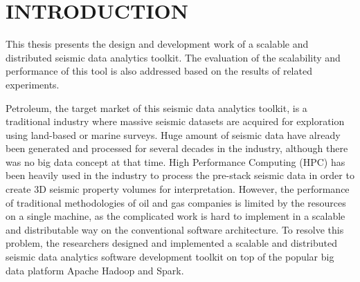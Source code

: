 %
%
%


\pagestyle{myheadings}
\setcounter{page}{1}


\chapter{\uppercase {Introduction}}
\let\thefootnote\relax{}
This thesis presents the design and development work of a scalable and distributed seismic data analytics toolkit.  The evaluation of the scalability and performance of this tool is also addressed based on the results of related experiments.

Petroleum, the target market of this seismic data analytics toolkit, is a traditional industry where massive seismic datasets are acquired for exploration using land-based or marine surveys. Huge amount of seismic data have already been generated and processed for several decades in the industry, although there was no big data concept at that time. High Performance Computing (HPC) has been heavily used in the industry to process the pre-stack seismic data in order to create 3D seismic property volumes for interpretation. However, the performance of traditional methodologies of oil and gas companies is limited by the resources on a single machine, as the complicated work is hard to implement in a scalable and distributable way on the conventional software architecture. To resolve this problem, the researchers designed and implemented a scalable and distributed seismic data analytics software development toolkit on top of the popular big data platform Apache Hadoop and Spark.



